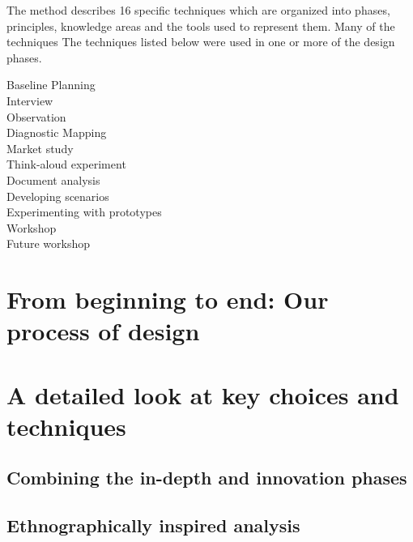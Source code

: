 The \must{} method describes 16 specific techniques which are organized into
phases, principles, knowledge areas and the tools used to represent them. Many
of the techniques 
The techniques listed below were used in one or more of the design phases.
\begin{description}
    \item [Baseline Planning]
    \item [Interview]
    \item [Observation]
    \item [Diagnostic Mapping]
    \item [Market study]
    \item [Think-aloud experiment]
    \item [Document analysis]
    \item [Developing scenarios]
    \item [Experimenting with prototypes]
    \item [Workshop]
    \item [Future workshop]
\end{description}

\section{From beginning to end: Our process of design} \label{sec:process}

\section{A detailed look at key choices and techniques} \label{sec:detailed}
\subsection{Combining the in-depth and innovation phases}

\subsection{Ethnographically inspired analysis}

